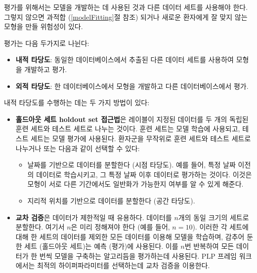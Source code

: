 \documentclass[11pt]{book}
\providecommand{\tightlist}{%
  \setlength{\itemsep}{0pt}\setlength{\parskip}{0pt}}
\theoremstyle{definition}
\theoremstyle{definition}
\theoremstyle{definition}
\theoremstyle{remark}
\let\BeginKnitrBlock\begin \let\EndKnitrBlock\end
\begin{document}
\BeginKnitrBlock{rmdimportant}
평가를 위해서는 모델을 개발하는 데 사용된 것과 다른 데이터 세트를
사용해야 한다. 그렇지 않으면 과적합 (\ref{modelFitting}절 참조) 되거나
새로운 환자에게 잘 맞지 않는 모형을 만들 위험성이 있다.
\EndKnitrBlock{rmdimportant}

평가는 다음 두가지로 나뉜다:

\begin{itemize}
\tightlist
\item
  \textbf{내적 타당도}: 동일한 데이터베이스에서 추출된 다른 데이터
  세트를 사용하여 모형을 개발하고 평가.
\item
  \textbf{외적 타당도}: 한 데이터베이스에서 모형을 개발하고 다른
  데이터베이스에서 평가. 
\end{itemize}

내적 타당도를 수행하는 데는 두 가지 방법이 있다:

\begin{itemize}
\tightlist
\item
  \textbf{홀드아웃 세트 holdout set 접근법}은 레이블이 지정된 데이터를
  두 개의 독립된 훈련 세트와 테스트 세트로 나누는 것이다. 훈련 세트는
  모델 학습에 사용되고, 테스트 세트는 모델 평가에 사용된다. 환자군을
  무작위로 훈련 세트와 테스트 세트로 나누거나 또는 다음과 같이 선택할 수
  있다:

  \begin{itemize}
  \tightlist
  \item
    날짜를 기반으로 데이터를 분할한다 (시점 타당도). 예를 들어, 특정
    날짜 이전의 데이터로 학습시키고, 그 특정 날짜 이후 데이터로 평가하는
    것이다. 이것은 모형이 서로 다른 기간에서도 일반화가 가능한지 여부를
    알 수 있게 해준다. 
  \item
    지리적 위치를 기반으로 데이터를 분할한다 (공간 타당도).
  \end{itemize}
\item
  \textbf{교차 검증}은 데이터가 제한적일 때 유용하다. 데이터를 \(n\)개의
  동일 크기의 세트로 분할한다. 여기서 \(n\)은 미리 정해져야 한다 (예를
  들어, \(n=10\)). 이러한 각 세트에 대해 한 세트의 데이터를 제외한 모든
  데이터를 이용해 모델을 학습하며, 감추어 둔 한 세트 (홀드아웃 세트)는
  예측 (평가)에 사용된다. 이를 \(n\)번 반복하여 모든 데이터가 한 번씩
  모델을 구축하는 알고리듬을 평가하는데 사용된다. PLP 프레임 워크에서는
  최적의 하이퍼파라미터를 선택하는데 교차 검증을 이용한다.
\end{itemize}
\end{document}
